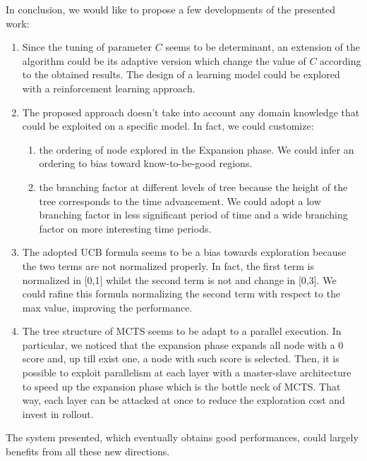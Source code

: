 \documentclass[11pt]{article}
\begin{document}
In conclusion, we would like to propose a few developments of the presented work:
\begin{enumerate}
    \item Since the tuning of parameter $C$ seems to be determinant, an extension of the algorithm could be its adaptive version which change the value of $C$ according to the obtained results. The design of a learning model could be explored with a reinforcement learning approach. 
    \item The proposed approach doesn't take into account any domain knowledge that could be exploited on a specific model. In fact, we could customize:
        \begin{enumerate}
            \item the ordering of node explored in the Expansion phase. We could infer an ordering to bias toward know-to-be-good regions.
            \item the branching factor at different levels of tree because the height of the tree corresponds to the time advancement. We could adopt a low branching factor in less significant period of time and a wide branching factor on more interesting time periods.
        \end{enumerate}
    \item The adopted UCB formula seems to be a bias towards exploration because the two terms are not normalized properly. In fact, the first term is normalized in [0,1] whilst the second term is not and change in [0,3]. We could rafine this formula normalizing the second term with respect to the max value, improving the performance.
    \item The tree structure of MCTS seems to be adapt to a parallel execution. In particular, we noticed that the expansion phase expands all node with a 0 score and, up till exist one, a node with such score is selected. Then, it is possible to exploit parallelism at each layer with a master-slave architecture to speed up the expansion phase which is the bottle neck of MCTS. That way, each layer can be attacked at once to reduce the exploration cost and invest in rollout. 
\end{enumerate}

The system presented, which eventually obtains good performances, could largely benefits from all these new directions.




\end{document}
